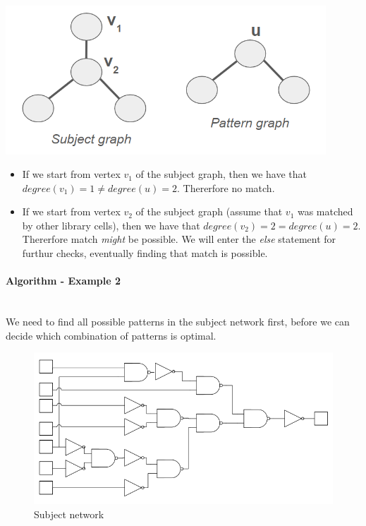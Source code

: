 \documentclass{article}
\begin{document}
\newpage
\begin{minipage}[t]{0.6\textwidth}
    \vspace{0pt}
    \includegraphics[width=12cm, scale=1]{S4/subjectPatternGraph.PNG}
\end{minipage}%
\begin{minipage}[t]{0.4\textwidth}
    \vspace{0pt}
    \begin{itemize}
        \item If we start from vertex $v_{1}$ of the subject graph, then we have that
                $degree(v_{1})=1 \neq degree(u)=2$. Thererfore no match.
        \vspace{0.25cm}
        \item If we start from vertex $v_{2}$ of the subject graph (assume that $v_{1}$ was matched by other library cells),
         then we have that $degree(v_{2})=2 = degree(u)=2$. Thererfore match \textit{might} be possible. We will enter the \textit{else} statement for furthur checks, eventually finding that match is possible.
    \end{itemize}
\end{minipage}

\vspace{2cm}
\paragraph{Algorithm - Example 2}\mbox{}\\
We need to find all possible patterns in the subject network first, before we can decide which combination of patterns is optimal.

\begin{figure}[htp]
    \centering
    \includegraphics[width=13cm, scale=1]{S4/problemStatement.PNG}
    \caption{Subject network}
\end{figure}
\end{document}
